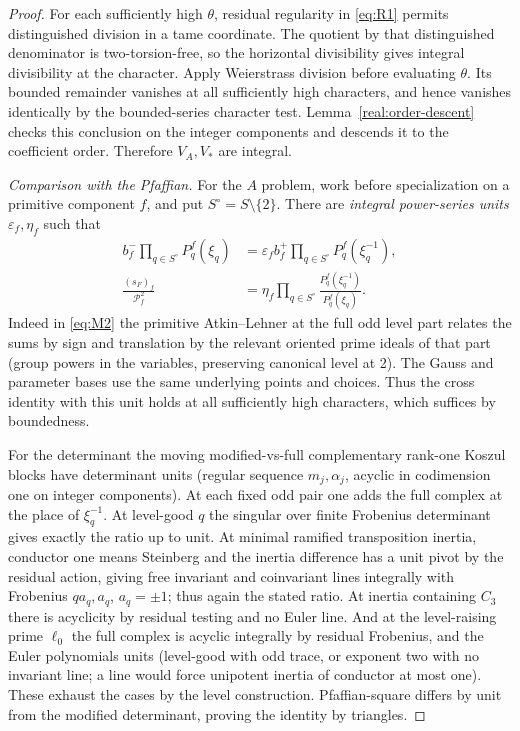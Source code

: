 \begin{proof}
For each sufficiently high \(\theta\), residual regularity in
\eqref{eq:R1} permits distinguished division in a tame coordinate.
The quotient by that distinguished denominator is two-torsion-free,
so the horizontal divisibility gives integral divisibility at the
character. Apply Weierstrass division before evaluating \(\theta\).
Its bounded remainder vanishes at all sufficiently high characters,
and hence vanishes identically by the bounded-series character test.
Lemma~\ref{real:order-descent} checks this conclusion on the integer
components and descends it to the coefficient order. Therefore
\(V_A,V_*\) are integral.

\emph{Comparison with the Pfaffian.}
For the \(A\) problem, work before specialization on a primitive
component \(f\), and put \(S^\circ=S\setminus\{2\}\). There are
\emph{integral power-series units} \(\varepsilon_f,\eta_f\) such that
\begin{align}
 b_f^-\prod_{q\in S^\circ}P_q^f(\xi_q)
 &=\varepsilon_f b_f^+
       \prod_{q\in S^\circ}P_q^f(\xi_q^{-1}),
 \label{real:opposite-orientations}\\
 \frac{(s_F)_f}{\mathcal P_f^2}
 &=\eta_f\prod_{q\in S^\circ}
       \frac{P_q^f(\xi_q^{-1})}{P_q^f(\xi_q)}.
 \label{real:determinant-ratio}
\end{align}
Indeed in \eqref{eq:M2} the primitive Atkin--Lehner at the full odd level part relates the sums by sign and translation by the relevant oriented prime ideals of that part (group powers in the variables, preserving canonical level at 2). The Gauss and parameter bases use the same underlying points and choices. Thus the cross identity with this unit holds at all sufficiently high characters, which suffices by boundedness.

For the determinant the moving modified-vs-full complementary rank-one Koszul blocks have determinant units (regular sequence \(m_j,\alpha_j\), acyclic in codimension one on integer components). At each fixed odd pair one adds the full complex at the place of \(\xi_q^{-1}\). At level-good \(q\) the singular over finite Frobenius determinant gives exactly the ratio up to unit. At minimal ramified transposition inertia, conductor one means Steinberg and the inertia difference has a unit pivot by the residual action, giving free invariant and coinvariant lines integrally with Frobenius \(q a_q,a_q\), \(a_q=\pm1\); thus again the stated ratio. At inertia containing \(C_3\) there is acyclicity by residual testing and no Euler line. And at the level-raising prime \(\ell_0\) the full complex is acyclic integrally by residual Frobenius, and the Euler polynomials units (level-good with odd trace, or exponent two with no invariant line; a line would force unipotent inertia of conductor at most one). These exhaust the cases by the level construction. Pfaffian-square differs by unit from the modified determinant, proving the identity by triangles.


\end{proof}

